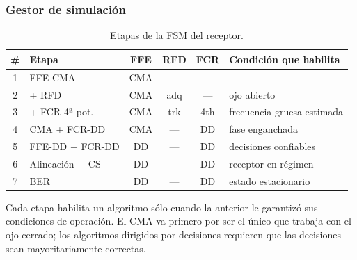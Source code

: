 \subsubsection*{Gestor de simulación}
\begin{table}[H]
\centering
\small
\begin{tabular}{clcccl}
\toprule
\# & Etapa & FFE & RFD & FCR & Condición que habilita \\
\midrule
1 & FFE-CMA           & CMA & ---  & ---  & --- \\
2 & + RFD             & CMA & adq  & ---  & ojo abierto \\
3 & + FCR 4ª pot.     & CMA & trk  & 4th  & frecuencia gruesa estimada \\
4 & CMA + FCR-DD      & CMA & ---  & DD   & fase enganchada \\
5 & FFE-DD + FCR-DD   & DD  & ---  & DD   & decisiones confiables \\
6 & Alineación + CS   & DD  & ---  & DD   & receptor en régimen \\
7 & BER               & DD  & ---  & DD   & estado estacionario \\
\bottomrule
\end{tabular}
\caption{Etapas de la FSM del receptor.}
\end{table}
Cada etapa habilita un algoritmo sólo cuando la anterior le garantizó sus
condiciones de operación. El CMA va primero por ser el único que trabaja con
el ojo cerrado; los algoritmos dirigidos por decisiones requieren que las
decisiones sean mayoritariamente correctas.
